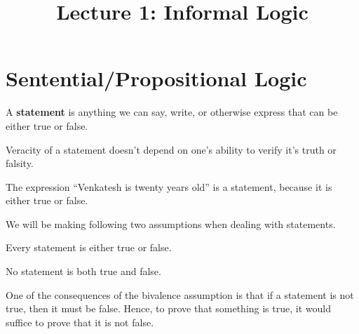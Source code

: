 \documentclass[a4paper,english,12pt]{article}
\title{Lecture 1: Informal Logic}
\begin{document}
\maketitle

\section{Sentential/Propositional Logic}
\begin{defn}[Statement] A \textbf{statement} is anything we can say, write, or otherwise express that can be either true or false. 
\end{defn}
\begin{rem} Veracity of a statement doesn't depend on one's ability to verify it's truth or falsity.
\end{rem}
\begin{exmp}
The expression ``Venkatesh is twenty years old'' is a statement, because it is either true or false.
\end{exmp}
We will be making following two assumptions when dealing with statements.
\begin{assum}[Bivalence] Every statement is either true or false.
\end{assum}
\begin{assum} No statement is both true and false.
\end{assum}
One of the consequences of the bivalence assumption is that if a statement is not true, then it must be false. Hence, to prove that something is true, it would suffice to prove that it is not false.
\end{document}
